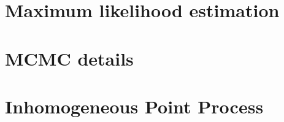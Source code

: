 \documentclass{book}
\begin{document}
\begin{comment}
\chapter{Introduction}
\label{chapt.intro}

\chapter{GLMS and WinBUGS}
\label{chapt.glms}

\chapter{Closed population models}
\label{chapt.closed}
\end{comment}



\chapter{Maximum likelihood estimation}
\label{chapt.mle}

\chapter{MCMC details}
\label{chapt.mcmc}

\chapter{Inhomogeneous Point Process}
\label{chapt.ipp}



\end{document}
